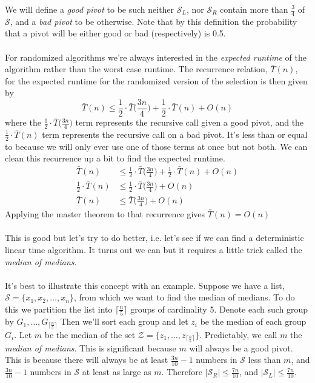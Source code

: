 \documentclass{article}
\newcommand{\ti}[1]{\textit{#1}}
\newcommand{\x}{\cdot}
\newcommand{\ds}{\displaystyle}
\newcommand{\ceil}[1]{\lceil #1 \rceil}
\newcommand{\Bigceil}[1]{\Big\lceil #1 \Big\rceil}
\begin{document}
We will define a \ti{good pivot} to be such neither $\mathcal{S}_L$, nor $\mathcal{S}_R$ contain more than $\ds \frac{3}{4}$ of $\mathcal{S}$, and a \ti{bad pivot} to be otherwise. Note that by this definition the probability that a pivot will be either good or bad (respectively) is 0.5.\\\\
For randomized algorithms we're always interested in the \ti{expected runtime} of the algorithm rather than the worst case runtime. The recurrence relation, $\bar{T}(n)$, for the expected runtime for the randomized version of the selection is then given by
\[\bar{T}(n) \leq \frac{1}{2}\x \bar{T}\Big(\frac{3n}{4}\Big) + \frac{1}{2}\x \bar{T}(n) + O(n)\]
where the $\ds \frac{1}{2}\x \bar{T}\Big(\frac{3n}{4}\Big)$ term represents the recursive call given a good pivot, and the $\ds \frac{1}{2}\x \bar{T}(n)$ term represents the recursive call on a bad pivot. It's less than or equal to because we will only ever use one of those terms at once but not both. We can clean this recurrence up a bit to find the expected runtime.
\begin{align*}
	\bar{T}(n) &\leq \frac{1}{2}\x \bar{T}\Big(\frac{3n}{4}\Big) + \frac{1}{2}\x \bar{T}(n) + O(n)\\
	\frac{1}{2}\x \bar{T}(n) &\leq \frac{1}{2}\x \bar{T}\Big(\frac{3n}{4}\Big) + O(n)\\
	\bar{T}(n) &\leq \bar{T}\Big(\frac{3n}{4}\Big) + O(n)
\end{align*}
Applying the master theorem to that recurrence gives $\bar{T}(n) = O(n)$\\\\
This is good but let's try to do better, i.e. let's see if we can find a deterministic linear time algorithm. It turns out we can but it requires a little trick called the \ti{median of medians}.\\\\
It's best to illustrate this concept with an example. Suppose we have a list, $\mathcal{S} = \{x_1, x_2, \dots, x_n\}$, from which we want to find the median of medians. To do this we partition the list into $\ds \Bigceil{\frac{n}{5}}$ groups of cardinality 5. Denote each such group by $G_1, \dots, G_{\ceil{\frac{n}{5}}}$ Then we'll sort each group and let $z_i$ be the median of each group $G_i$. Let $m$ be the median of the set $\mathcal{Z} = \{z_1, \dots, z_{\ceil{\frac{n}{5}}}\}$. Predictably, we call $m$ the \ti{median of medians}. This is significant because $m$ will always be a good pivot. This is because there will always be at least $\ds \frac{3n}{10} - 1$ numbers in $\mathcal{S}$ less than $m$, and $\ds \frac{3n}{10} - 1$ numbers in $\mathcal{S}$ at least as large as $m$. Therefore $\ds |\mathcal{S}_R| \leq \frac{7n}{10}$, and $\ds |\mathcal{S}_L| \leq \frac{7n}{10}$.\\\\
\end{document}

